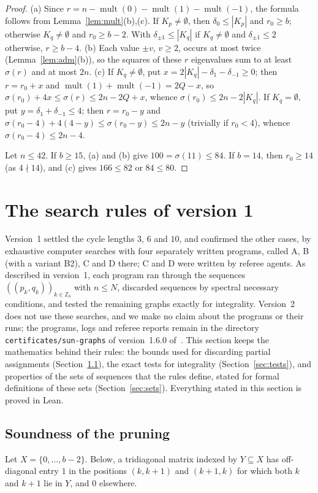\documentclass[11pt]{article}
\theoremstyle{definition}
\theoremstyle{remark}
\DeclareMathOperator{\mult}{mult}
\newcommand{\Z}{\mathbb Z}
\begin{document}
\begin{proof}
(a) Since $r=n-\mult(0)-\mult(1)-\mult(-1)$, the formula follows from
Lemma~\ref{lem:mult}(b),(c). If $K_p\ne\emptyset$, then $\delta_0\le|K_p|$ and
$r_0\ge b$; otherwise $K_q\ne\emptyset$ and $r_0\ge b-2$. With
$\delta_{\pm1}\le|K_q|$ if $K_q\ne\emptyset$ and $\delta_{\pm1}\le2$ otherwise,
$r\ge b-4$. (b) Each value $\pm v$, $v\ge2$, occurs at most twice
(Lemma~\ref{lem:adm}(b)), so the squares of these $r$ eigenvalues sum to at
least $\sigma(r)$ and at most $2n$. (c) If $K_q\ne\emptyset$, put
$x=2|K_q|-\delta_1-\delta_{-1}\ge0$; then $r=r_0+x$ and
$\mult(1)+\mult(-1)=2Q-x$, so
$\sigma(r_0)+4x\le\sigma(r)\le2n-2Q+x$, whence $\sigma(r_0)\le2n-2|K_q|$. If
$K_q=\emptyset$, put $y=\delta_1+\delta_{-1}\le4$; then $r=r_0-y$ and
$\sigma(r_0-4)+4(4-y)\le\sigma(r_0-y)\le2n-y$ (trivially if $r_0<4$), whence
$\sigma(r_0-4)\le2n-4$.

Let $n\le42$. If $b\ge15$, (a) and (b) give $100=\sigma(11)\le84$. If $b=14$,
then $r_0\ge14$ (as $4\nmid14$), and (c) gives $166\le82$ or $84\le80$.
\end{proof}

\section{The search rules of version 1}\label{sec:comp}
Version~1 settled the cycle lengths $3$, $6$ and $10$, and confirmed the other
cases, by exhaustive computer searches with four separately written programs,
called A, B (with a variant B2), C and D there; C and D were written by referee
agents. As described in version~1, each program ran through the sequences $((p_k,q_k))_{k\in\Z_b}$ with
$n\le N$, discarded sequences by spectral necessary conditions, and tested the
remaining graphs exactly for integrality. Version~2 does not use these
searches, and we make no claim about the programs or their runs; the programs,
logs and referee reports remain in the directory
\texttt{certificates/sun-graphs} of version~1.6.0 of~\cite{repo}. This section
keeps the mathematics behind their rules: the bounds used for discarding
partial assignments (Section~\ref{sec:prune}), the exact tests for
integrality (Section~\ref{sec:tests}), and properties of the sets of
sequences that the rules define, stated for formal definitions of these sets
(Section~\ref{sec:sets}). Everything stated in this section is proved in Lean.

\subsection{Soundness of the pruning}\label{sec:prune}
Let $X=\{0,\dots,b-2\}$. Below, a tridiagonal matrix indexed by $Y\subseteq X$
has off-diagonal entry $1$ in the positions $(k,k+1)$ and $(k+1,k)$ for which
both $k$ and $k+1$ lie in $Y$, and $0$ elsewhere.
\end{document}
